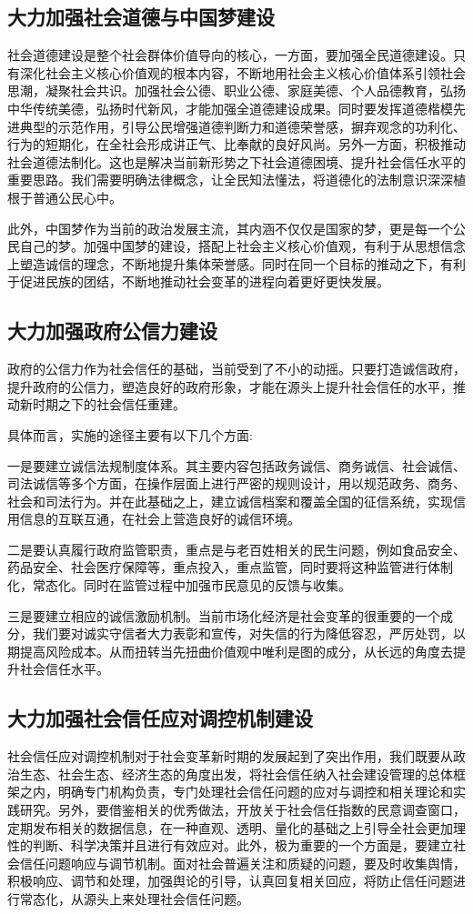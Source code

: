 \documentclass[UTF8]{ctexart}
\begin{document}
    \subsection{大力加强社会道德与中国梦建设}
    社会道德建设是整个社会群体价值导向的核心，一方面，要加强全民道德建设。只有深化社会主义核心价值观的根本内容，不断地用社会主义核心价值体系引领社会思潮，凝聚社会共识。加强社会公德、职业公德、家庭美德、个人品德教育，弘扬中华传统美德，弘扬时代新风，才能加强全道德建设成果。同时要发挥道德楷模先进典型的示范作用，引导公民增强道德判断力和道德荣誉感，摒弃观念的功利化、行为的短期化，在全社会形成讲正气、比奉献的良好风尚。另外一方面，积极推动社会道德法制化。这也是解决当前新形势之下社会道德困境、提升社会信任水平的重要思路。我们需要明确法律概念，让全民知法懂法，将道德化的法制意识深深植根于普通公民心中。

    此外，中国梦作为当前的政治发展主流，其内涵不仅仅是国家的梦，更是每一个公民自己的梦。加强中国梦的建设，搭配上社会主义核心价值观，有利于从思想信念上塑造诚信的理念，不断地提升集体荣誉感。同时在同一个目标的推动之下，有利于促进民族的团结，不断地推动社会变革的进程向着更好更快发展。

    \subsection{大力加强政府公信力建设}
    政府的公信力作为社会信任的基础，当前受到了不小的动摇。只要打造诚信政府，提升政府的公信力，塑造良好的政府形象，才能在源头上提升社会信任的水平，推动新时期之下的社会信任重建。

    具体而言，实施的途径主要有以下几个方面:

    一是要建立诚信法规制度体系。其主要内容包括政务诚信、商务诚信、社会诚信、司法诚信等多个方面，在操作层面上进行严密的规则设计，用以规范政务、商务、社会和司法行为。并在此基础之上，建立诚信档案和覆盖全国的征信系统，实现信用信息的互联互通，在社会上营造良好的诚信环境。

    二是要认真履行政府监管职责，重点是与老百姓相关的民生问题，例如食品安全、药品安全、社会医疗保障等，重点投入，重点监管，同时要将这种监管进行体制化，常态化。同时在监管过程中加强市民意见的反馈与收集。

    三是要建立相应的诚信激励机制。当前市场化经济是社会变革的很重要的一个成分，我们要对诚实守信者大力表彰和宣传，对失信的行为降低容忍，严厉处罚，以期提高风险成本。从而扭转当先扭曲价值观中唯利是图的成分，从长远的角度去提升社会信任水平。

    \subsection{大力加强社会信任应对调控机制建设}
    社会信任应对调控机制对于社会变革新时期的发展起到了突出作用，我们既要从政治生态、社会生态、经济生态的角度出发，将社会信任纳入社会建设管理的总体框架之内，明确专门机构负责，专门处理社会信任问题的应对与调控和相关理论和实践研究。另外，要借鉴相关的优秀做法，开放关于社会信任指数的民意调查窗口，定期发布相关的数据信息，在一种直观、透明、量化的基础之上引导全社会更加理性的判断、科学决策并且进行有效应对。此外，极为重要的一个方面是，要建立社会信任问题响应与调节机制。面对社会普遍关注和质疑的问题，要及时收集舆情，积极响应、调节和处理，加强舆论的引导，认真回复相关回应，将防止信任问题进行常态化，从源头上来处理社会信任问题。
\end{document}
